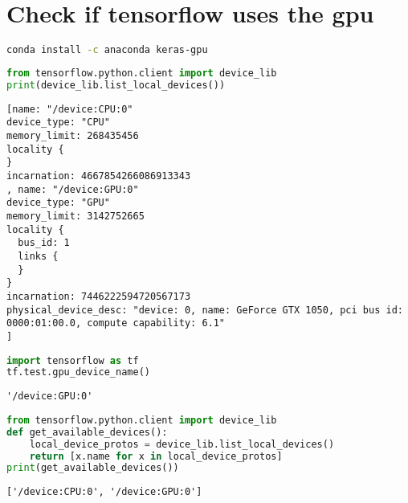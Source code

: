 \hypertarget{check-if-tensorflow-uses-the-gpu}{%
\section{Check if tensorflow uses the
gpu}\label{check-if-tensorflow-uses-the-gpu}}

\begin{lstlisting}[language=bash]
conda install -c anaconda keras-gpu
\end{lstlisting}

\begin{lstlisting}[language=Python]
from tensorflow.python.client import device_lib
print(device_lib.list_local_devices())
\end{lstlisting}

\begin{lstlisting}
[name: "/device:CPU:0"
device_type: "CPU"
memory_limit: 268435456
locality {
}
incarnation: 4667854266086913343
, name: "/device:GPU:0"
device_type: "GPU"
memory_limit: 3142752665
locality {
  bus_id: 1
  links {
  }
}
incarnation: 7446222594720567173
physical_device_desc: "device: 0, name: GeForce GTX 1050, pci bus id: 0000:01:00.0, compute capability: 6.1"
]
\end{lstlisting}

\begin{lstlisting}[language=Python]
import tensorflow as tf
tf.test.gpu_device_name()
\end{lstlisting}

\begin{lstlisting}
'/device:GPU:0'
\end{lstlisting}

\begin{lstlisting}[language=Python]
from tensorflow.python.client import device_lib
def get_available_devices():
    local_device_protos = device_lib.list_local_devices()
    return [x.name for x in local_device_protos]
print(get_available_devices()) 
\end{lstlisting}

\begin{lstlisting}
['/device:CPU:0', '/device:GPU:0']
\end{lstlisting}

